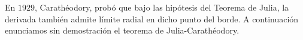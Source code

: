 \begin{example}

\end{example}

En $1929$, Carathéodory, probó que bajo las hipótesis del Teorema de Julia, la derivada también admite límite radial en dicho punto del borde. A continuación enunciamos sin demostración el teorema de Julia-Carathéodory. \\

